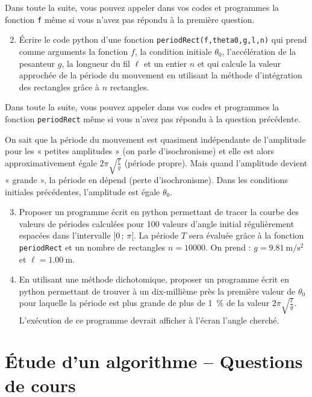 Dans toute la suite, vous pouvez appeler dans vos codes et programmes la fonction \texttt{f} même si vous n'avez pas répondu à la première question.

\begin{enumerate}
\setcounter{enumi}{1}
 \item Écrire le code python d'une fonction \texttt{periodRect(f,theta0,g,l,n)} qui prend comme arguments la fonction $f$, la condition initiale $\theta_0$, l'accélération de la pesanteur $g$, la longueur du fil $\ell$ et un entier $n$ et qui calcule la valeur approchée de la période du mouvement en utilisant la méthode d'intégration des rectangles grâce à $n$ rectangles. 
\end{enumerate} 

Dans toute la suite, vous pouvez appeler dans vos codes et programmes la fonction \texttt{periodRect} même si vous n'avez pas répondu à la question précédente.

On sait que la période du mouvement est quasiment indépendante de l'amplitude pour les « petites amplitudes » (on parle d'isochronisme) et elle est alors approximativement égale $2\pi\sqrt{\tfrac{\ell}{g}}$ (période propre). Mais quand l'amplitude devient « grande », la période en dépend (perte d'isochronisme). Dans les conditions initiales précédentes, l'amplitude est égale $\theta_0$.

\begin{enumerate}
\setcounter{enumi}{2}
 \item Proposer un programme écrit en python permettant de tracer la courbe des valeurs de périodes calculées pour 100 valeurs d'angle initial régulièrement espacées dans l'intervalle $]0\,;\,\pi[$. La période $T$ sera évaluée grâce à la fonction \texttt{periodRect} et un nombre de rectangles $n=10000$. On prend : $g=\SI{9,81}{\meter\per\second\squared}$ et $\ell = \SI{1,00}{\meter}$.
 
 \item En utilisant une méthode dichotomique, proposer un programme  écrit en python permettant de trouver à un dix-millième près la première valeur de $\theta_0$ pour laquelle la période est plus grande de plus de \SI{1}{\percent} de la valeur $2\pi\sqrt{\tfrac{\ell}{g}}$. L'exécution de ce programme devrait afficher à l'écran l'angle cherché.
\end{enumerate}

\newpage

\section{Étude d'un algorithme -- Questions de cours}

